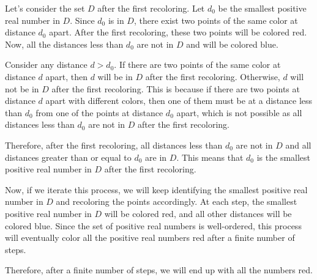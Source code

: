 Let's consider the set $D$ after the first recoloring. Let $d_0$ be the smallest positive real number in $D$. Since $d_0$ is in $D$, there exist two points of the same color at distance $d_0$ apart. After the first recoloring, these two points will be colored red. Now, all the distances less than $d_0$ are not in $D$ and will be colored blue.

Consider any distance $d > d_0$. If there are two points of the same color at distance $d$ apart, then $d$ will be in $D$ after the first recoloring. Otherwise, $d$ will not be in $D$ after the first recoloring. This is because if there are two points at distance $d$ apart with different colors, then one of them must be at a distance less than $d_0$ from one of the points at distance $d_0$ apart, which is not possible as all distances less than $d_0$ are not in $D$ after the first recoloring.

Therefore, after the first recoloring, all distances less than $d_0$ are not in $D$ and all distances greater than or equal to $d_0$ are in $D$. This means that $d_0$ is the smallest positive real number in $D$ after the first recoloring.

Now, if we iterate this process, we will keep identifying the smallest positive real number in $D$ and recoloring the points accordingly. At each step, the smallest positive real number in $D$ will be colored red, and all other distances will be colored blue. Since the set of positive real numbers is well-ordered, this process will eventually color all the positive real numbers red after a finite number of steps.

Therefore, after a finite number of steps, we will end up with all the numbers red.
